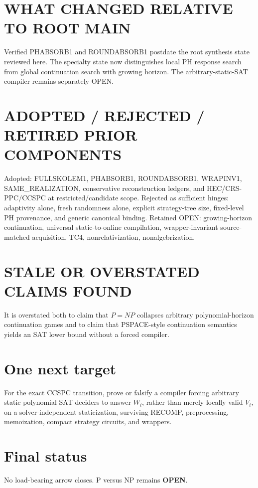 \documentclass{article}
\begin{document}
\section*{WHAT CHANGED RELATIVE TO ROOT MAIN}
Verified PHABSORB1 and ROUNDABSORB1 postdate the root synthesis state reviewed here. The specialty state now distinguishes local PH response search from global continuation search with growing horizon. The arbitrary-static-SAT compiler remains separately OPEN.

\section*{ADOPTED / REJECTED / RETIRED PRIOR COMPONENTS}
Adopted: FULLSKOLEM1, PHABSORB1, ROUNDABSORB1, WRAPINV1, SAME_REALIZATION, conservative reconstruction ledgers, and HEC/CRS-PPC/CCSPC at restricted/candidate scope.
Rejected as sufficient hinges: adaptivity alone, fresh randomness alone, explicit strategy-tree size, fixed-level PH provenance, and generic canonical binding.
Retained OPEN: growing-horizon continuation, universal static-to-online compilation, wrapper-invariant source-matched acquisition, TC4, nonrelativization, nonalgebrization.

\section*{STALE OR OVERSTATED CLAIMS FOUND}
It is overstated both to claim that \(P=NP\) collapses arbitrary polynomial-horizon continuation games and to claim that PSPACE-style continuation semantics yields an SAT lower bound without a forced compiler.

\section*{One next target}
For the exact CCSPC transition, prove or falsify a compiler forcing arbitrary static polynomial SAT deciders to answer \(W_i\), rather than merely locally valid \(V_i\), on a solver-independent staticization, surviving RECOMP, preprocessing, memoization, compact strategy circuits, and wrappers.

\section*{Final status}
No load-bearing arrow closes. P versus NP remains \textbf{OPEN}.

\end{document}

